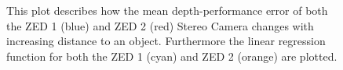 \begin{figure}[h]
\begin{center}
		\caption{This plot describes how the mean depth-performance error of both the ZED 1 (blue) and ZED 2 (red) Stereo Camera changes with increasing distance to an object. Furthermore the linear regression function for both the ZED 1 (cyan) and ZED 2 (orange) are plotted. 
		 }
	 	\label{plot:zed1Benchmark}
	\end{center}
\end{figure}
